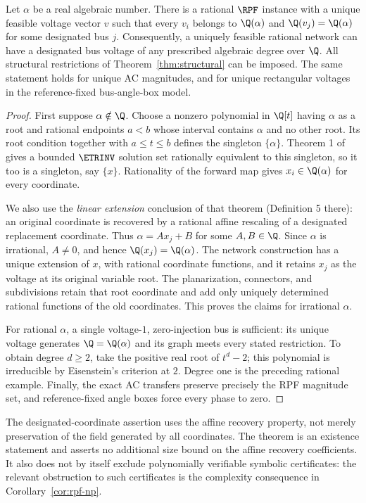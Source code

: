 \begin{theorem}
\label{thm:algebraic-degree}
Let $\alpha$ be a real algebraic number. There is a rational $\RPF$
instance with a unique feasible voltage vector $v$ such that every $v_i$
belongs to $\Q(\alpha)$ and $\Q(v_j)=\Q(\alpha)$ for some designated bus
$j$. Consequently, a uniquely feasible rational network can have a designated
bus voltage of any prescribed algebraic degree over $\Q$.
All structural restrictions of Theorem~\ref{thm:structural} can be imposed.
The same statement holds for unique AC magnitudes, and for unique rectangular
voltages in the reference-fixed bus-angle-box model.
\end{theorem}
\begin{proof}
First suppose $\alpha\notin\Q$. Choose a nonzero polynomial in $\Q[t]$
having $\alpha$ as a root and rational endpoints $a<b$ whose interval
contains $\alpha$ and no other root. Its root condition together with
$a\le t\le b$ defines the singleton $\{\alpha\}$.
Theorem 1 of \citet{AbrahamsenMiltzow2019} gives a bounded $\ETRINV$
solution set rationally equivalent to this singleton, so it too is a
singleton, say $\{x\}$. Rationality of the forward map gives
$x_i\in\Q(\alpha)$ for every coordinate.

We also use the \emph{linear extension} conclusion of that theorem
(Definition 5 there): an original coordinate is recovered by a rational
affine rescaling of a designated replacement coordinate. Thus
$\alpha=A x_j+B$ for some $A,B\in\Q$. Since $\alpha$ is irrational,
$A\ne0$, and hence $\Q(x_j)=\Q(\alpha)$.
The network construction has a unique extension of $x$, with rational
coordinate functions, and it retains $x_j$ as the voltage at its original
variable root. The planarization, connectors, and subdivisions retain that
root coordinate and add only uniquely determined rational functions of the
old coordinates. This proves the claims for irrational $\alpha$.

For rational $\alpha$, a single voltage-$1$, zero-injection bus is sufficient:
its unique voltage generates $\Q=\Q(\alpha)$ and its graph meets every
stated restriction. To obtain degree $d\ge2$, take the positive real root
of $t^d-2$; this polynomial is irreducible by Eisenstein's criterion at $2$.
Degree one is the preceding rational example. Finally, the exact AC transfers
preserve precisely the RPF magnitude set, and reference-fixed angle boxes
force every phase to zero.
\end{proof}

The designated-coordinate assertion uses the affine recovery property,
not merely preservation of the field generated by all coordinates. The
theorem is an existence statement and asserts no additional size bound on
the affine recovery coefficients. It also does not by itself exclude
polynomially verifiable symbolic certificates: the relevant obstruction to
such certificates is the complexity consequence in
Corollary~\ref{cor:rpf-np}.
